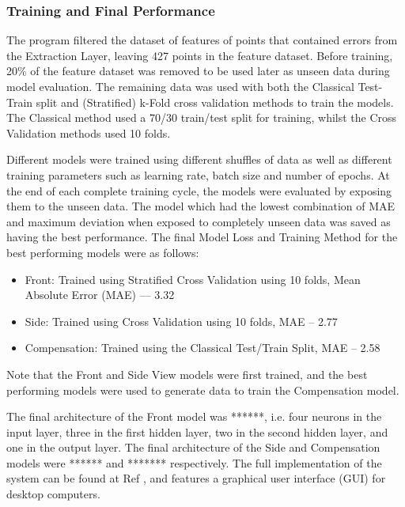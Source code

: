\documentclass[conference]{IEEEtran}
\begin{document}
\subsubsection{Training and Final Performance} \label{trainingandperformance}
The program filtered the dataset of features of points that contained errors from the Extraction Layer, leaving 427 points in the feature dataset.
Before training, 20\% of the feature dataset was removed to be used later as unseen data during model evaluation.
The remaining data was used with both the Classical Test-Train split and (Stratified) k-Fold cross validation methods to train the models.
The Classical method used a 70/30 train/test split for training, whilst the Cross Validation methods used 10 folds.

Different models were trained using different shuffles of data as well as different training parameters such as learning rate, batch size and number of epochs.
At the end of each complete training cycle, the models were evaluated by exposing them to the unseen data.
The model which had the lowest combination of MAE and maximum deviation when exposed to completely unseen data was saved as having the best performance.
The final Model Loss and Training Method for the best performing models were as follows:
\begin{itemize}
\item Front: Trained using Stratified Cross Validation using 10 folds, Mean Absolute Error (MAE) — 3.32
\item Side: Trained using Cross Validation using 10 folds, MAE -- 2.77
\item Compensation: Trained using the Classical Test/Train Split, MAE -- 2.58
\end{itemize}
Note that the Front and Side View models were first trained, and the best performing models were used to generate data to train the Compensation model.

The final architecture of the Front model was ******, i.e. four neurons in the input layer, three in the first hidden layer, two in the second hidden layer, and one in the output layer.
The final architecture of the Side and Compensation models were ****** and ******* respectively. The full implementation of the system can be found at Ref \cite{repo}, and features a graphical user interface (GUI) for desktop computers.
\end{document}
